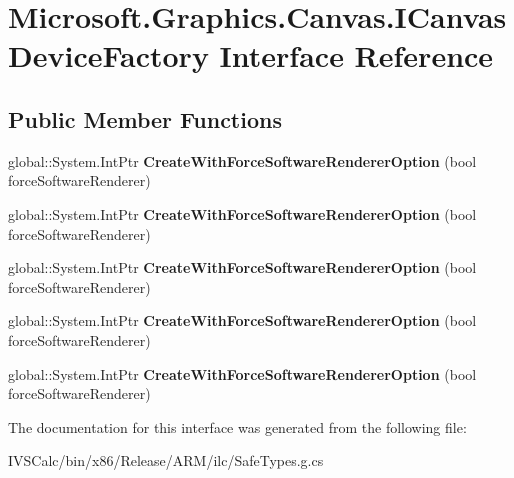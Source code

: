 \hypertarget{interface_microsoft_1_1_graphics_1_1_canvas_1_1_i_canvas_device_factory}{}\section{Microsoft.\+Graphics.\+Canvas.\+I\+Canvas\+Device\+Factory Interface Reference}
\label{interface_microsoft_1_1_graphics_1_1_canvas_1_1_i_canvas_device_factory}
\subsection*{Public Member Functions}
\begin{DoxyCompactItemize}
\item 
\mbox{\label{interface_microsoft_1_1_graphics_1_1_canvas_1_1_i_canvas_device_factory_a292683d5978f1aa1527cb6696d17550a}} 
global\+::\+System.\+Int\+Ptr {\bfseries Create\+With\+Force\+Software\+Renderer\+Option} (bool force\+Software\+Renderer)
\item 
\mbox{\label{interface_microsoft_1_1_graphics_1_1_canvas_1_1_i_canvas_device_factory_a292683d5978f1aa1527cb6696d17550a}} 
global\+::\+System.\+Int\+Ptr {\bfseries Create\+With\+Force\+Software\+Renderer\+Option} (bool force\+Software\+Renderer)
\item 
\mbox{\label{interface_microsoft_1_1_graphics_1_1_canvas_1_1_i_canvas_device_factory_a292683d5978f1aa1527cb6696d17550a}} 
global\+::\+System.\+Int\+Ptr {\bfseries Create\+With\+Force\+Software\+Renderer\+Option} (bool force\+Software\+Renderer)
\item 
\mbox{\label{interface_microsoft_1_1_graphics_1_1_canvas_1_1_i_canvas_device_factory_a292683d5978f1aa1527cb6696d17550a}} 
global\+::\+System.\+Int\+Ptr {\bfseries Create\+With\+Force\+Software\+Renderer\+Option} (bool force\+Software\+Renderer)
\item 
\mbox{\label{interface_microsoft_1_1_graphics_1_1_canvas_1_1_i_canvas_device_factory_a292683d5978f1aa1527cb6696d17550a}} 
global\+::\+System.\+Int\+Ptr {\bfseries Create\+With\+Force\+Software\+Renderer\+Option} (bool force\+Software\+Renderer)
\end{DoxyCompactItemize}


The documentation for this interface was generated from the following file\+:\begin{DoxyCompactItemize}
\item 
I\+V\+S\+Calc/bin/x86/\+Release/\+A\+R\+M/ilc/Safe\+Types.\+g.\+cs\end{DoxyCompactItemize}
